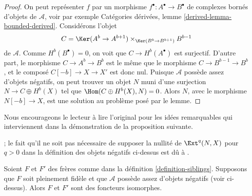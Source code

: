 \begin{proof}
On peut représenter $f$ par un morphisme $f^\bullet : A^\bullet \to B^\bullet$
de complexes bornés d'objets de $\mathcal{A}$, voir par exemple
Catégories dérivées, lemme \ref{derived-lemma-bounded-derived}.
Considérons l'objet
$$
C = \Ker(A^b \to A^{b + 1}) \times_{\Ker(B^b \to B^{b + 1})} B^{b - 1}
$$
de $\mathcal{A}$. Comme $H^b(B^\bullet) = 0$, on voit que
$C \to H^b(A^\bullet)$ est surjectif. D'autre part, le morphisme
$C \to A^b \to B^b$ est le même que le morphisme $C \to B^{b - 1} \to B^b$,
et le composé $C[-b] \to X \to X'$ est donc nul.
Puisque $\mathcal{A}$ possède assez d'objets négatifs, on peut trouver un objet $N$
muni d'une surjection $N \to C \oplus H^b(X)$ tel que
$\Hom(C \oplus H^b(X), N) = 0$. Alors $N$, avec le morphisme
$N[-b] \to X$, est une solution au problème posé par le lemme.
\end{proof}

\noindent
Nous encourageons le lecteur à lire l'original
\cite[Proposition 2.16]{Orlov-K3} pour les idées remarquables
qui interviennent dans la démonstration de la proposition suivante.

\begin{proposition}
\label{proposition-siblings-isomorphic}
\begin{reference}
\cite[Proposition 2.16]{Orlov-K3} ; le fait qu'il ne soit pas nécessaire
de supposer la nullité de $\Ext^q(N, X)$ pour $q > 0$ dans la définition
des objets négatifs ci-dessus est dû à \cite{Canonaco-Stellari}.
\end{reference}
Soient $F$ et $F'$ des frères comme dans la définition \ref{definition-siblings}.
Supposons que $F$ soit pleinement fidèle et que $\mathcal{A}$ possède assez
d'objets négatifs (voir ci-dessus). Alors $F$ et $F'$ sont des foncteurs isomorphes.
\end{proposition}

